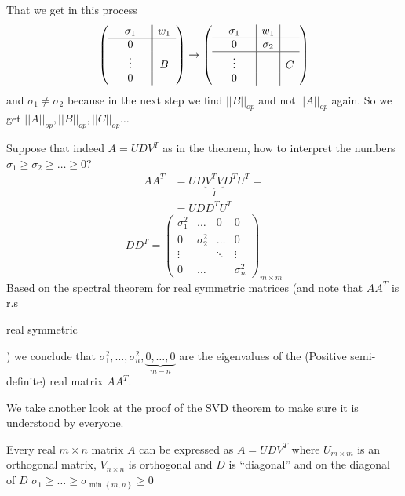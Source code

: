 \begin{insight}
That we get in this process 
\[
\left(\begin{array}{ccc|ccc}
 & \sigma_{1} &  & w_{1}\\
\hline  & 0 & \\
 & \vdots &  & B\\
 & 0 & 
\end{array}\right)\to\left(\begin{array}{ccc|c|cc}
 & \sigma_{1} &  & w_{1}\\
\hline  & 0 &  & \sigma_{2}\\
\hline  & \vdots &  &  & C\\
 & 0 &  & 
\end{array}\right)
\]
and $\sigma_{1}\ne\sigma_{2}$ because in the next step we find $\left|\left|B\right|\right|_{op}$
and not $\left|\left|A\right|\right|_{op}$ again. So we get $\left|\left|A\right|\right|_{op},\left|\left|B\right|\right|_{op},\left|\left|C\right|\right|_{op}\dots$%
\end{insight}

Suppose that indeed $A=UDV^{T}$ as in the theorem, how to interpret
the numbers $\sigma_{1}\ge\sigma_{2}\ge\dots\ge0$? 
\begin{align*}
AA^{T} & =UD\underbrace{V^{T}V}_{I}D^{T}U^{T}=\\
 & =UDD^{T}U^{T}
\end{align*}
\[
DD^{T}=\left(\begin{matrix}\sigma_{1}^{2} & \dots & 0 & 0\\
0 & \sigma_{2}^{2} & \dots & 0\\
\vdots &  & \ddots & \vdots\\
0 & \dots &  & \sigma_{n}^{2}
\end{matrix}\right)_{m\times m}
\]
 Based on the spectral theorem for real symmetric matrices (and note
that $AA^{T}$ is r.s%
\begin{insight}
real symmetric%
\end{insight}
) we conclude that $\sigma_{1}^{2},\dots,\sigma_{n}^{2},\underbrace{0,\dots,0}_{m-n}$
are the eigenvalues of the (Positive semi-definite) real matrix $AA^{T}$.

We take another look at the proof of the SVD theorem to make sure
it is understood by everyone.
\begin{thm}[SVD]
 Every real $m\times n$ matrix $A$ can be expressed as $A=UDV^{T}$
where $U_{m\times m}$ is an orthogonal matrix, $V_{n\times n}$ is
orthogonal and $D$ is ``diagonal'' and on the diagonal of $D$
$\sigma_{1}\ge\dots\ge\sigma_{\min\left\{ m,n\right\} }\ge0$
\end{thm}

